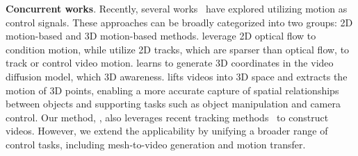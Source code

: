 \textbf{Concurrent works}. %
Recently, several works~\cite{geng2024motion, niu2025mofa, koroglu2024onlyflow, jeong2024track4gen, shi2024motion, lei2024animateanything,feng2024i2vcontrol,zhang2024world} have explored utilizing motion as control signals. These approaches can be broadly categorized into two groups: 2D motion-based and 3D motion-based methods.  
\cite{koroglu2024onlyflow, shi2024motion,lei2024animateanything} leverage 2D optical flow to condition motion, while \cite{niu2025mofa,geng2024motion,jeong2024track4gen} utilize 2D tracks, which are sparser than optical flow, to track or control video motion. 
\cite{zhang2024world} learns to generate 3D coordinates in the video diffusion model, which 3D awareness. \cite{feng2024i2vcontrol} lifts videos into 3D space and extracts the motion of 3D points, enabling a more accurate capture of spatial relationships between objects and supporting tasks such as object manipulation and camera control. Our method, \methodname, also leverages recent tracking methods~\cite{xiao2024spatialtracker,zhang2024protracker} to construct videos. However, we extend the applicability by unifying a broader range of control tasks, including mesh-to-video generation and motion transfer.
